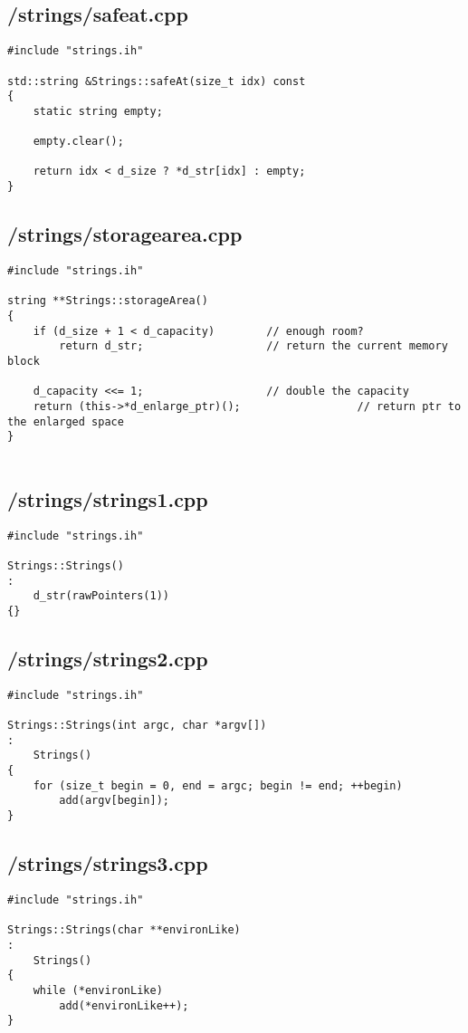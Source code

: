 \documentclass{article}
\begin{document}
\subsection*{/strings/safeat.cpp}
\begin{verbatim}
#include "strings.ih"

std::string &Strings::safeAt(size_t idx) const
{
    static string empty;

    empty.clear();

    return idx < d_size ? *d_str[idx] : empty;
}

\end{verbatim}
\subsection*{/strings/storagearea.cpp}
\begin{verbatim}
#include "strings.ih"

string **Strings::storageArea()
{
    if (d_size + 1 < d_capacity)        // enough room?
        return d_str;                   // return the current memory block

    d_capacity <<= 1;                   // double the capacity
    return (this->*d_enlarge_ptr)();                  // return ptr to the enlarged space
}


\end{verbatim}
\subsection*{/strings/strings1.cpp}
\begin{verbatim}
#include "strings.ih"

Strings::Strings()
:
    d_str(rawPointers(1))
{}

\end{verbatim}
\subsection*{/strings/strings2.cpp}
\begin{verbatim}
#include "strings.ih"

Strings::Strings(int argc, char *argv[])
:
    Strings()
{
    for (size_t begin = 0, end = argc; begin != end; ++begin)
        add(argv[begin]);
}

\end{verbatim}
\subsection*{/strings/strings3.cpp}
\begin{verbatim}
#include "strings.ih"

Strings::Strings(char **environLike)
:
    Strings()
{
    while (*environLike)
        add(*environLike++);
}

\end{verbatim}
\end{document}
